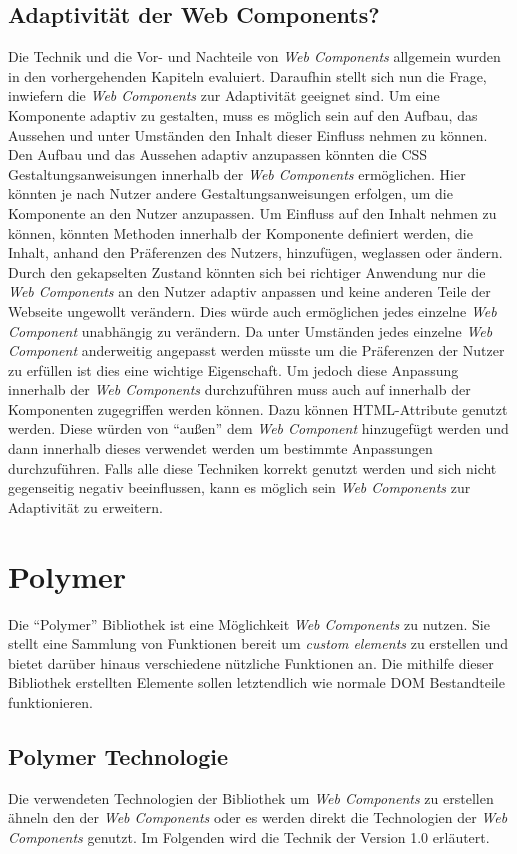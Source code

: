\documentclass[12pt, paper=a4, bibtotoc, toc=listof, headsepline=true]{scrreprt}
\begin{document}
	\section{Adaptivität der Web Components?}
	Die Technik und die Vor- und Nachteile von \emph{Web Components} allgemein wurden in den vorhergehenden Kapiteln evaluiert. Daraufhin stellt sich nun die Frage, inwiefern die \emph{Web Components} zur Adaptivität geeignet sind. Um eine Komponente adaptiv zu gestalten, muss es möglich sein auf den Aufbau, das Aussehen und unter Umständen den Inhalt dieser Einfluss nehmen zu können.
	\newline
	Den Aufbau und das Aussehen adaptiv anzupassen könnten die \ac{CSS} Gestaltungsanweisungen innerhalb der \emph{Web Components} ermöglichen. Hier könnten je nach Nutzer andere Gestaltungsanweisungen erfolgen, um die Komponente an den Nutzer anzupassen. Um Einfluss auf den Inhalt nehmen zu können, könnten Methoden innerhalb der Komponente definiert werden, die Inhalt, anhand den Präferenzen des Nutzers, hinzufügen, weglassen oder ändern. Durch den gekapselten Zustand könnten sich bei richtiger Anwendung nur die \emph{Web Components} an den Nutzer adaptiv anpassen und keine anderen Teile der Webseite ungewollt verändern. Dies würde auch ermöglichen jedes einzelne \emph{Web Component} unabhängig zu verändern. Da unter Umständen jedes einzelne \emph{Web Component} anderweitig angepasst werden müsste um die Präferenzen der Nutzer zu erfüllen ist dies eine wichtige Eigenschaft. Um jedoch diese Anpassung innerhalb der \emph{Web Components} durchzuführen muss auch auf innerhalb der Komponenten zugegriffen werden können. Dazu können HTML-Attribute genutzt werden. Diese würden von \enquote{außen} dem \emph{Web Component} hinzugefügt werden und dann innerhalb dieses verwendet werden um bestimmte Anpassungen durchzuführen. Falls alle diese Techniken korrekt genutzt werden und sich nicht gegenseitig negativ beeinflussen, kann es möglich sein \emph{Web Components} zur Adaptivität zu erweitern.
\chapter{Polymer}
Die \enquote{Polymer} Bibliothek ist eine Möglichkeit \emph{Web Components} zu nutzen. Sie stellt eine Sammlung von Funktionen bereit um \emph{custom elements} zu erstellen und bietet darüber hinaus verschiedene nützliche Funktionen an. Die mithilfe dieser Bibliothek erstellten Elemente sollen letztendlich wie normale \ac{DOM} Bestandteile funktionieren\cite{polymerFeaOve}.
	\section{Polymer Technologie} Die verwendeten Technologien der Bibliothek um \emph{Web Components} zu erstellen ähneln den der \emph{Web Components} oder es werden direkt die Technologien der \emph{Web Components} genutzt. Im Folgenden wird die Technik der Version 1.0 erläutert.
\end{document}
